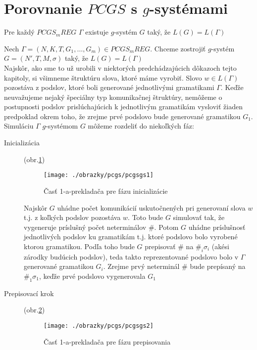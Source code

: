 \section{Porovnanie $PCGS$ s $g$-systémami}

\begin{veta}
Pre každý $PCGS_mREG$ $\Gamma$ existuje $g$-systém $G$ taký, že
$L(G)=L(\Gamma)$
\end{veta}

\begin{dokaz}
Nech $\Gamma=(N,K,T,G_1,\dots ,G_m)\in PCGS_mREG$. Chceme
zostrojiť $g$-systém $G=(N',T,M,\sigma)$ taký, že $L(G)=L(\Gamma)$
\\ Najskôr, ako sme to už urobili v niektorých predchádzajúcich
dôkazoch tejto kapitoly, si všimneme štruktúru slova, ktoré máme
vyrobiť. Slovo $w\in L(\Gamma)$ pozostáva z podslov, ktoré boli
generované jednotlivými gramatikami $\Gamma$. Keďže neuvažujeme
nejaký špeciálny typ komunikačnej štruktúry, nemôžeme o
postupnosti podslov prislúchajúcich k jednotlivým gramatikám
vysloviť žiaden predpoklad okrem toho, že zrejme prvé podslovo
bude generované gramatikou $G_1$.
\\ Simuláciu $\Gamma$ $g$-systémom $G$ môžeme rozdeliť do
niekoľkých fáz:
\begin{description}
  \item[Inicializácia] (obr.\ref{pcgsgs1})

\begin{figure}[ht]
  \centering
  \texttt{[image: ./obrazky/pcgs/pcgsgs1]}
  \caption{Časť 1-a-prekladača pre fázu inicializácie}\label{pcgsgs1}
\end{figure}

  Najskôr $G$ uhádne počet komunikácií uskutočnených pri
  generovaní slova $w$ t.j. z koľkých podslov pozostáva $w$. Toto
  bude $G$ simulovať tak, že vygeneruje príslušný počet neterminálov $\#$.
  Potom $G$ uhádne príslušnosť jednotlivých podslov ku gramatikám
  t.j. ktoré podslovo bolo vyrobené ktorou gramatikou. Podľa toho
  bude $G$ prepisovať $\#$ na $\#_i\sigma_i$ (akési zárodky budúcich podslov),
  teda takto reprezentované podslovo bolo v $\Gamma$ generované gramatikou
  $G_i$. Zrejme prvý neterminál $\#$ bude prepísaný na $\#_1\sigma_1$, keďže
  prvé podslovo vygenerovala $G_1$

  \item[Prepisovací krok] (obr.\ref{pcgsgs2})
\begin{figure}[ht]
  \centering
  \texttt{[image: ./obrazky/pcgs/pcgsgs2]}
  \caption{Časť 1-a-prekladača pre fázu prepisovania}\label{pcgsgs2}
\end{figure}


\end{description}
\end{dokaz}
